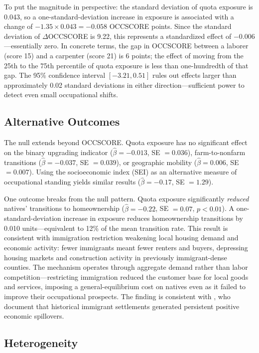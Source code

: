 \documentclass[12pt]{article}
\begin{document}
To put the magnitude in perspective: the standard deviation of quota exposure is 0.043, so a one-standard-deviation increase in exposure is associated with a change of $-1.35 \times 0.043 = -0.058$ OCCSCORE points.  Since the standard deviation of $\Delta$OCCSCORE is 9.22, this represents a standardized effect of $-0.006$---essentially zero.  In concrete terms, the gap in OCCSCORE between a laborer (score 15) and a carpenter (score 21) is 6 points; the effect of moving from the 25th to the 75th percentile of quota exposure is less than one-hundredth of that gap.  The 95\% confidence interval $[-3.21, 0.51]$ rules out effects larger than approximately 0.02 standard deviations in either direction---sufficient power to detect even small occupational shifts.

\subsection{Alternative Outcomes}

The null extends beyond OCCSCORE.  Quota exposure has no significant effect on the binary upgrading indicator ($\hat{\beta} = -0.013$, SE $= 0.036$), farm-to-nonfarm transitions ($\hat{\beta} = -0.037$, SE $= 0.039$), or geographic mobility ($\hat{\beta} = 0.006$, SE $= 0.007$).  Using the socioeconomic index (SEI) as an alternative measure of occupational standing yields similar results ($\hat{\beta} = -0.17$, SE $= 1.29$).

One outcome breaks from the null pattern.  Quota exposure significantly \textit{reduced} natives' transitions to homeownership ($\hat{\beta} = -0.22$, SE $= 0.07$, $p < 0.01$).  A one-standard-deviation increase in exposure reduces homeownership transitions by 0.010 units---equivalent to 12\% of the mean transition rate.  This result is consistent with immigration restriction weakening local housing demand and economic activity: fewer immigrants meant fewer renters and buyers, depressing housing markets and construction activity in previously immigrant-dense counties.  The mechanism operates through aggregate demand rather than labor competition---restricting immigration reduced the customer base for local goods and services, imposing a general-equilibrium cost on natives even as it failed to improve their occupational prospects.  The finding is consistent with \citet{sequeira2020immigrants}, who document that historical immigrant settlements generated persistent positive economic spillovers.

\subsection{Heterogeneity}
\end{document}
